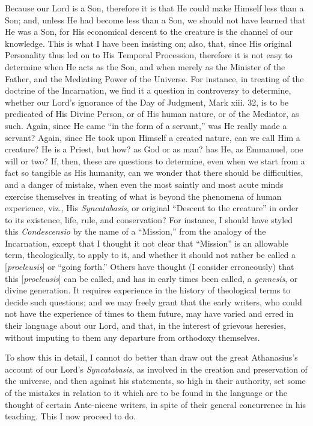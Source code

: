 
Because our Lord is a Son, therefore it is that He could make
Himself less than a Son; and, unless He had become less than a Son, we
should not have learned that He was a Son, for His economical descent
to the creature is the channel of our knowledge. This is what I have
been insisting on; also, that, since His original Personality thus led
on to His Temporal Procession, therefore it is not easy to determine
when He acts as the Son, and when merely as the Minister of the
Father, and the Mediating Power of the Universe. For instance, in
treating of the doctrine of the Incarnation, we find it a question in
controversy to determine, whether our Lord's ignorance of the Day of
Judgment, Mark xiii. 32, is to be predicated of His Divine Person, or
of His human nature, or of the Mediator, as such. Again, since He came
``in the form of a servant,'' was He really made a servant?
Again, since He took upon Himself a created nature, can we call Him a
creature? He is a Priest, but how? as God or as man? has He, as
Emmanuel, one will or two? If, then, these are questions to determine,
even when we start from a fact so tangible as His humanity, can we
wonder that there should be difficulties, and a danger of mistake,
when even the most saintly and most acute minds exercise themselves in
treating of what is beyond the phenomena of human experience, viz., His
\emph{Syncatabasis}, or original ``Descent to the creature''
in order to its existence, life, rule, and conservation? For
instance, I should have styled this \emph{Condescensio} by the name of
a ``Mission,'' from the analogy of the Incarnation, except
that I thought it not clear that ``Mission'' is an allowable
term, theologically, to apply to it, and whether it should not rather
be called a [\emph{proeleusis}] or ``going forth.'' Others
have thought (I consider erroneously) that this [\emph{proeleusis}]
can be called, and has in early times been called, a \emph{gennesis},
or divine generation. It requires experience in the history of
theological terms to decide such questions; and we may freely grant
that the early writers, who could not have the experience of times to
them future, may have varied and erred in their language about our
Lord, and that, in the interest of grievous heresies, without imputing
to them any departure from orthodoxy themselves.

To show this in detail, I cannot do better than draw out the great
Athanasius's account of our Lord's \emph{Syncatabasis}, as involved in
the creation and preservation of the universe, and then against his
statements, so high in their authority, set some of the mistakes in
relation to it which are to be found in the language or the thought of
certain Ante-nicene writers, in spite of their general concurrence in
his teaching. This I now proceed to do.


